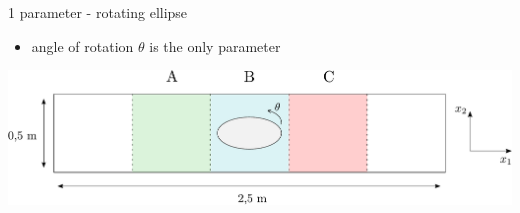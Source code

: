 \documentclass[aspectratio=169,xcolor=dvipsnames]{beamer}
\begin{document}
\begin{frame}{1 parameter - rotating ellipse}
	\begin{itemize}
		\item angle of rotation $ \theta $ is the only parameter
		\vspace{7mm}
	\end{itemize}
	\includegraphics[width=1\linewidth, trim={0 0 0 0}, clip]{Images/elipsa1.pdf}	
\end{frame}
\end{document}
